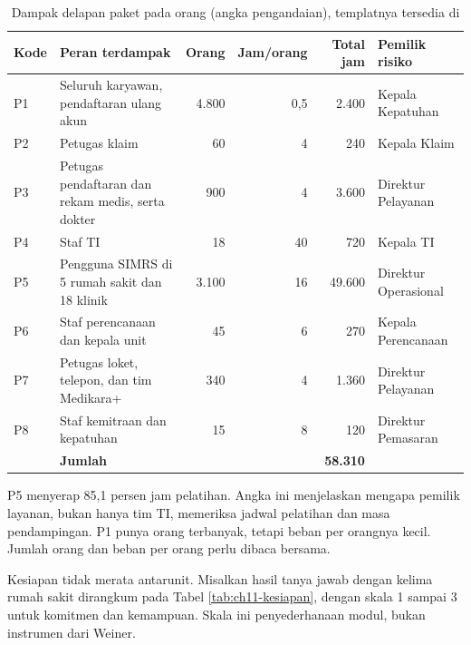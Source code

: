 \begin{table}[!htb]
  \centering
  \caption{Dampak delapan paket pada orang (angka pengandaian), templatnya tersedia di
           }
  \label{tab:ch11-dampak}
  \footnotesize
  \begin{tabularx}{\textwidth}{l>{\raggedright\arraybackslash}Xrrr>{\raggedright\arraybackslash}p{2.5cm}}
    \hline
    \textbf{Kode} & \textbf{Peran terdampak} & \textbf{Orang} & \textbf{Jam/orang} & \textbf{Total jam} & \textbf{Pemilik risiko} \\ \hline
    P1 & Seluruh karyawan, pendaftaran ulang akun & 4.800 & 0,5 & 2.400 & Kepala Kepatuhan \\ \hline
    P2 & Petugas klaim & 60 & 4 & 240 & Kepala Klaim \\ \hline
    P3 & Petugas pendaftaran dan rekam medis, serta dokter & 900 & 4 & 3.600 & Direktur Pelayanan \\ \hline
    P4 & Staf TI & 18 & 40 & 720 & Kepala TI \\ \hline
    P5 & Pengguna SIMRS di 5 rumah sakit dan 18 klinik & 3.100 & 16 & 49.600 & Direktur Operasional \\ \hline
    P6 & Staf perencanaan dan kepala unit & 45 & 6 & 270 & Kepala Perencanaan \\ \hline
    P7 & Petugas loket, telepon, dan tim Medikara+ & 340 & 4 & 1.360 & Direktur Pelayanan \\ \hline
    P8 & Staf kemitraan dan kepatuhan & 15 & 8 & 120 & Direktur Pemasaran \\ \hline
    & \textbf{Jumlah} & & & \textbf{58.310} & \\ \hline
  \end{tabularx}
\end{table}

P5 menyerap 85,1 persen jam pelatihan. Angka ini menjelaskan mengapa pemilik layanan, bukan hanya tim TI, memeriksa jadwal pelatihan dan
masa pendampingan. P1 punya orang terbanyak, tetapi beban per orangnya kecil. Jumlah orang dan beban per orang perlu dibaca bersama.

Kesiapan tidak merata antarunit. Misalkan hasil tanya jawab dengan kelima rumah sakit dirangkum pada Tabel \ref{tab:ch11-kesiapan}, dengan
skala 1 sampai 3 untuk komitmen dan kemampuan. Skala ini penyederhanaan modul, bukan instrumen dari Weiner.

